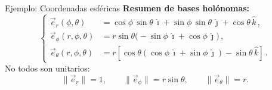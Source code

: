 \documentclass[../apunte_mecanica_clasica.tex]{subfiles}%
\begin{document}
\begin{apuntebloque}{Ejemplo: Coordenadas esféricas}
\medskip
\noindent \textbf{Resumen de bases holónomas:}
\begin{equation*}
\left\{
\begin{aligned}
\vec{e}_r(\phi,\theta)&=\cos\phi\,\sin\theta\,\hat{\imath}+\sin\phi\,\sin\theta\,\hat{\jmath}+\cos\theta\,\hat{k}\,,\\[4pt]
\vec{e}_\phi(r,\phi,\theta)&=r\sin\theta\big(-\sin\phi\,\hat{\imath}+\cos\phi\,\hat{\jmath}\big)\,,\\[4pt]
\vec{e}_\theta(r,\phi,\theta)&=r\left[\cos\theta\left(\cos\phi\,\hat{\imath}+\sin\phi\,\hat{\jmath}\right)-\sin\theta\,\hat{k}\right] \,.
\end{aligned}
\right.
\end{equation*}
No todos son unitarios:
\begin{equation*}
\|\vec{e}_r\|=1,\qquad \|\vec{e}_\phi\|=r\sin\theta,\qquad \|\vec{e}_\theta\|=r.
\end{equation*}

\end{apuntebloque}
\end{document}
